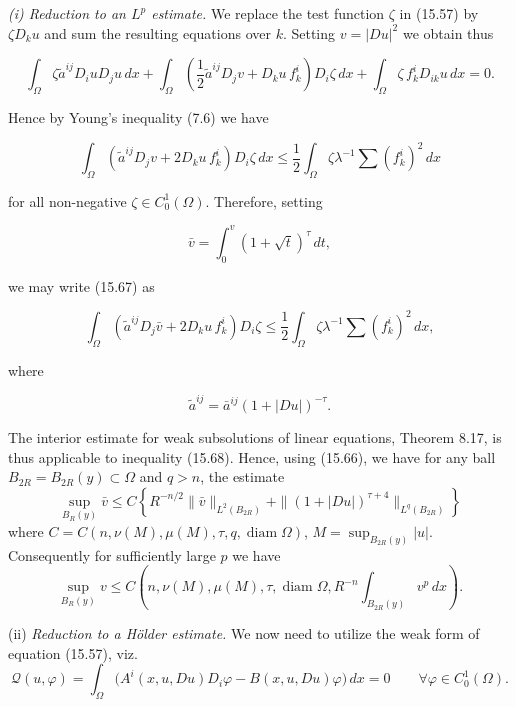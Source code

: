 \medskip

\noindent\textit{(i) Reduction to an $L^p$ estimate.} We replace the test function $\zeta$ in (15.57) by
$\zeta D_k u$ and sum the resulting equations over $k$. Setting $v=|Du|^2$ we obtain thus

\[
\int_{\Omega} \zeta \tilde{a}^{ij}D_i u D_j u\,dx+\int_{\Omega}\left(\frac12 \tilde{a}^{ij}D_j v + D_k u\,f_k^i\right)D_i\zeta\,dx+\int_{\Omega}\zeta\,f_k^i D_{ik}u\,dx=0.
\]

Hence by Young's inequality (7.6) we have

\begin{equation}
\int_{\Omega}\left(\tilde{a}^{ij}D_j v+2D_k u\,f_k^i\right)D_i\zeta\,dx\le \frac12\int_{\Omega}\zeta\lambda^{-1}\sum (f_k^i)^2\,dx
\tag{15.67}
\end{equation}

for all non-negative $\zeta\in C_0^1(\Omega)$. Therefore, setting

\[
\bar{v}=\int_0^v (1+\sqrt{t})^\tau\,dt,
\]

we may write (15.67) as

\begin{equation}
\int_{\Omega}\left(\tilde{a}^{ij}D_j \bar{v}+2D_k u\,f_k^i\right)D_i\zeta\le \frac12\int_{\Omega}\zeta\lambda^{-1}\sum (f_k^i)^2\,dx,
\tag{15.68}
\end{equation}

where

\[
\tilde{a}^{ij}=\bar{a}^{ij}(1+|Du|)^{-\tau}.
\]


The interior estimate for weak subsolutions of linear equations, Theorem 8.17, is thus applicable to inequality (15.68). Hence, using (15.66), we have for any ball $B_{2R}=B_{2R}(y)\subset \Omega$ and $q>n$, the estimate
\[
\sup_{B_R(y)} \bar v \le C\left\{R^{-n/2}\|\bar v\|_{L^2(B_{2R})}+\|(1+|Du|)^{\tau+4}\|_{L^q(B_{2R})}\right\}
\]
where $C=C(n,\nu(M),\mu(M),\tau,q,\operatorname{diam}\Omega)$, $M=\sup_{B_{2R}(y)}|u|$. Consequently for sufficiently large $p$ we have
\begin{equation}
\sup_{B_R(y)} v \le C(n,\nu(M),\mu(M),\tau,\operatorname{diam}\Omega,R^{-n}\int_{B_{2R}(y)} v^p\,dx).
\tag{15.69}
\end{equation}

\noindent (ii) \textit{Reduction to a Hölder estimate.} We now need to utilize the weak form of equation (15.57), viz.
\begin{equation}
\mathcal{Q}(u,\varphi)=\int_{\Omega}\bigl(A^i(x,u,Du)D_i\varphi-B(x,u,Du)\varphi\bigr)\,dx=0 \qquad \forall \varphi\in C_0^1(\Omega).
\tag{15.70}
\end{equation}

